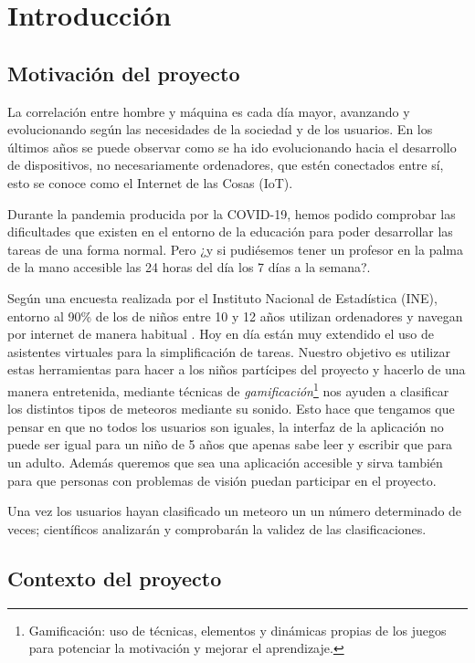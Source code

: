 \chapter{Introducción}
\section{Motivación del proyecto}
La correlación entre hombre y máquina es cada día mayor, avanzando y evolucionando según las necesidades de la sociedad y de los usuarios. En los últimos años se puede observar como se ha ido evolucionando hacia el desarrollo de dispositivos, no necesariamente ordenadores, que estén conectados entre sí, esto se conoce como el Internet de las Cosas (IoT).

Durante la pandemia producida por la COVID-19, hemos podido comprobar las dificultades que existen en el entorno de la educación para poder desarrollar las tareas de una forma normal. Pero ¿y si pudiésemos tener un profesor en la palma de la mano accesible las 24 horas del día los 7 días a la semana?. 

Según una encuesta realizada por el Instituto Nacional de Estadística (INE), entorno al 90\% de los de niños entre 10 y 12 años utilizan ordenadores y navegan por internet de manera habitual \cite{ine}. Hoy en día están muy extendido el uso de asistentes virtuales para la simplificación de tareas. Nuestro objetivo es utilizar estas herramientas para hacer a los niños partícipes  del proyecto y hacerlo de una manera entretenida, mediante técnicas de \textit{gamificación}\footnote{Gamificación: uso de técnicas, elementos y dinámicas propias de los juegos para potenciar la motivación y mejorar el aprendizaje.} nos ayuden a clasificar los distintos tipos de meteoros mediante su sonido.
Esto hace que tengamos que pensar en que no todos los usuarios son iguales, la interfaz de la aplicación no puede ser igual para un niño de 5 años que apenas sabe leer y escribir que para un adulto. Además queremos que sea una aplicación accesible y sirva también para que personas con problemas de visión puedan participar en el proyecto.

Una vez los usuarios hayan clasificado un meteoro un un número determinado de veces; científicos analizarán y comprobarán la validez de las clasificaciones.
\vspace*{1cm}

\section{Contexto del proyecto}

